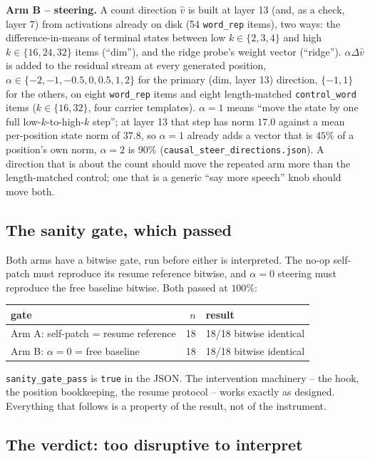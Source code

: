 \documentclass[11pt]{article}
\begin{document}
\textbf{Arm B -- steering.} A count direction $\hat v$ is built at layer 13 (and,
as a check, layer 7) from activations already on disk (54 \texttt{word\_rep}
items), two ways: the difference-in-means of terminal states between low
$k\in\{2,3,4\}$ and high $k\in\{16,24,32\}$ items (``dim''), and the ridge probe's
weight vector (``ridge''). $\alpha\Delta\hat v$ is added to the residual stream
at every generated position, $\alpha\in\{-2,-1,-0.5,0,0.5,1,2\}$ for the primary
(dim, layer 13) direction, $\{-1,1\}$ for the others, on eight \texttt{word\_rep}
items and eight length-matched \texttt{control\_word} items ($k\in\{16,32\}$,
four carrier templates). $\alpha{=}1$ means ``move the state by one full
low-$k$-to-high-$k$ step''; at layer 13 that step has norm $17.0$ against a
mean per-position state norm of $37.8$, so $\alpha{=}1$ already adds a vector
that is $45\%$ of a position's own norm, $\alpha{=}2$ is $90\%$
(\texttt{causal\_steer\_directions.json}). A direction that is about the count
should move the repeated arm more than the length-matched control; one that is a
generic ``say more speech'' knob should move both.

\subsection{The sanity gate, which passed}

Both arms have a bitwise gate, run before either is interpreted. The no-op
self-patch must reproduce its resume reference bitwise, and $\alpha{=}0$
steering must reproduce the free baseline bitwise. Both passed at $100\%$:

\begin{center}
\begin{tabular}{lrl}
\toprule
gate & $n$ & result \\
\midrule
Arm A: self-patch = resume reference & 18 & 18/18 bitwise identical \\
Arm B: $\alpha{=}0$ = free baseline   & 18 & 18/18 bitwise identical \\
\bottomrule
\end{tabular}
\end{center}

\noindent \texttt{sanity\_gate\_pass} is \texttt{true} in the JSON. The
intervention machinery -- the hook, the position bookkeeping, the resume
protocol -- works exactly as designed. Everything that follows is a property of
the result, not of the instrument.

\subsection{The verdict: too disruptive to interpret}
\end{document}
